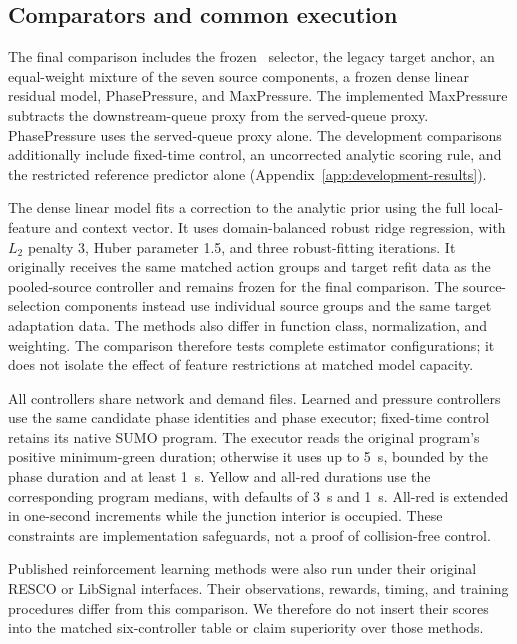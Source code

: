 \subsection{Comparators and common execution}
The final comparison includes the frozen \method\ selector, the legacy target anchor, an equal-weight mixture of the seven source components, a frozen dense linear residual model, PhasePressure, and MaxPressure. The implemented MaxPressure subtracts the downstream-queue proxy from the served-queue proxy. PhasePressure uses the served-queue proxy alone. The development comparisons additionally include fixed-time control, an uncorrected analytic scoring rule, and the restricted reference predictor alone (Appendix~\ref{app:development-results}).

The dense linear model fits a correction to the analytic prior using the full local-feature and context vector. It uses domain-balanced robust ridge regression, with $L_2$ penalty 3, Huber parameter 1.5, and three robust-fitting iterations. It originally receives the same matched action groups and target refit data as the pooled-source controller and remains frozen for the final comparison. The source-selection components instead use individual source groups and the same target adaptation data. The methods also differ in function class, normalization, and weighting. The comparison therefore tests complete estimator configurations; it does not isolate the effect of feature restrictions at matched model capacity.

All controllers share network and demand files. Learned and pressure controllers use the same candidate phase identities and phase executor; fixed-time control retains its native SUMO program. The executor reads the original program's positive minimum-green duration; otherwise it uses up to 5~s, bounded by the phase duration and at least 1~s. Yellow and all-red durations use the corresponding program medians, with defaults of 3~s and 1~s. All-red is extended in one-second increments while the junction interior is occupied. These constraints are implementation safeguards, not a proof of collision-free control.

Published reinforcement learning methods were also run under their original RESCO or LibSignal interfaces. Their observations, rewards, timing, and training procedures differ from this comparison. We therefore do not insert their scores into the matched six-controller table or claim superiority over those methods.

